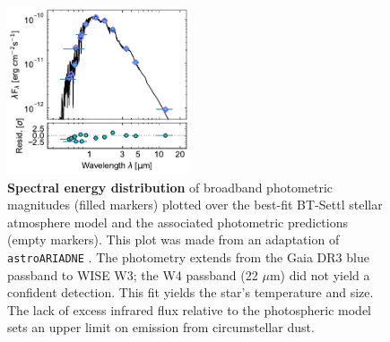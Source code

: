\documentclass[11pt,twocolumn,tighten,linenumbers]{aastex7}
\begin{document}
\begin{figure}[!t]
  \centering
  \includegraphics[width=0.48\textwidth]{f4.pdf}
  \caption{
    {\bf Spectral energy distribution} of broadband photometric magnitudes
    (filled markers) plotted over the best-fit BT-Settl stellar
    atmosphere model \citep{Allard2012} and the associated photometric
    predictions (empty markers).  This plot was made from an
    adaptation of \texttt{astroARIADNE} \citep{Vines2022}.  The
    photometry extends from the Gaia DR3 blue passband to WISE W3;
    the W4 passband (22 $\mu$m) did not yield a confident detection.
    This fit yields the star's temperature and size.  The lack of
    excess infrared flux relative to the photospheric model sets an
    upper limit on emission from circumstellar dust.
    }
  \label{fig:sed}
\end{figure}
\end{document}
